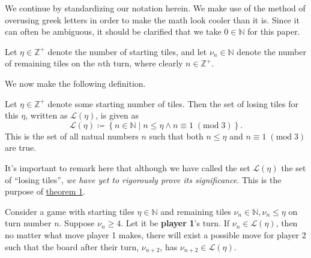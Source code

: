 \documentclass[11pt, letterpaper]{article}
\begin{document}
We continue by standardizing our notation herein. We make use of the method of overusing greek letters in order to make the math look cooler than it is. Since it can often be ambiguous, it should be clarified that we take $0\in\mathbb{N}$ for this paper.
\begin{notation}
	Let $\eta \in\mathbb{Z}^+$ denote the number of starting tiles, and let $\nu_n\in\mathbb{N} $ denote the number of remaining tiles on the $n$th turn, where clearly $n\in\mathbb{Z}^+$.
\end{notation}
We now make the following definition.
\begin{definition}\label{dfn:1}
	Let $\eta \in\mathbb{Z}^+$ denote some starting number of tiles. Then the set of losing tiles for this $\eta $, written as $\mathcal{L} (\eta )$, is given as
	\[
		\mathcal{L} (\eta )\coloneqq \left\{ n\in\mathbb{N} \mid n\leq \eta \land  n\equiv 1\;(\text{mod}\;3) \right\} 
	.\]
	This is the set of all natual numbers $n$ such that both $n\leq \eta $ and $n\equiv 1\;(\text{mod}\;3)$ are true.
\end{definition}
It's important to remark here that although we have called the set $\mathcal{L} (\eta )$ the set of ``losing tiles'', \emph{we have yet to rigorously prove its significance}. This is the purpose of \hyperref[lma:1]{theorem 1}.
\begin{theorem}\label{lma:1}
	Consider a game with starting tiles $\eta \in\mathbb{N}$ and remaining tiles $\nu_n \in\mathbb{N},\nu_n \leq \eta $ on turn number $n$. Suppose $\nu_n \geq 4$. Let it be \textbf{player} \textbf{1}'s turn. If $\nu_n \in \mathcal{L} (\eta )$, then no matter what move player 1 makes, there will exist a possible move for player 2 such that the board after their turn, $\nu_{n+2}$, has $\nu _{n+2}\in \mathcal{L} (\eta )$.
\end{theorem}
\end{document}
